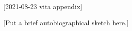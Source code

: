 [2021-08-23 vita appendix]

\begin{vita}
\index{\verb+\begin{vita}+}
  
[Put a brief autobiographical sketch here.]

\end{vita}
